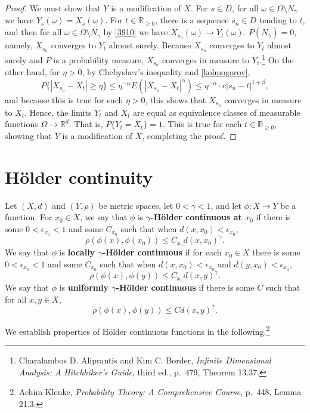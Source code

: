 \documentclass{article}
\theoremstyle{definition}
\theoremstyle{definition}
\begin{document}
\begin{proof}
We must show that $Y$ is a modification of $X$. For $s \in D$, for all $\omega \in \Omega \setminus N_\gamma$ we have
$Y_s(\omega) = X_s(\omega)$. For $t \in \mathbb{R}_{\geq 0}$, there is a sequence $s_n \in D$ tending to $t$, and then
for all $\omega \in \Omega \setminus N_\gamma$  by \eqref{3910} we have $X_{s_n}(\omega) \to Y_t(\omega)$. 
$P(N_\gamma)=0$, namely, $X_{s_n}$ converges to $Y_t$ almost surely. Because $X_{s_n}$ converges to $Y_t$
almost surely and $P$ is a probability measure, $X_{s_n}$ converges in measure to $Y_t$.\footnote{Charalambos D. Aliprantis
and Kim C. Border, {\em Infinite Dimensional Analysis: A Hitchhiker's Guide}, third ed., p.~479, Theorem 13.37.}
On the other hand, 
for
$\eta>0$, by  Chebyshev's inequality and \eqref{kolmogorov},
\[
P\{|X_{s_n}-X_t| \geq \eta\} \leq \eta^{-\alpha} E(|X_{s_n}-X_t|^\alpha) \leq \eta^{-\alpha} \cdot c |s_n-t|^{1+\beta},
\]
and because this is true for each $\eta>0$,
this shows that $X_{s_n}$ converges in measure to $X_t$. Hence, 
the limits $Y_t$ and $X_t$ are equal as  equivalence classes of
measurable functions $\Omega \to \mathbb{R}^d$.
That is, $P\{Y_t = X_t\}=1$.  This is true for each $t \in \mathbb{R}_{\geq 0}$, showing that $Y$ is a modification of $X$, completing the proof.
\end{proof}

\section{H\"older continuity}
Let $(X,d)$ and $(Y,\rho)$ be metric spaces, let $0<\gamma<1$, and let
$\phi:X \to Y$ be a function. For 
$x_0 \in X$, we say that $\phi$ is \textbf{$\gamma$-H\"older continuous at $x_0$}
if there is some $0<\epsilon_{x_0}<1$ and some $C_{x_0}$ such that when
$d(x,x_0)< \epsilon_{x_0}$,
\[
\rho(\phi(x),\phi(x_0)) \leq C_{x_0} d(x,x_0)^\gamma.
\]
We say that $\phi$ is \textbf{locally $\gamma$-H\"older continuous} if for each
$x_0 \in X$ there is some $0<\epsilon_{x_0}<1$ and some
$C_{x_0}$ such that when $d(x,x_0)< \epsilon_{x_0}$ and $d(y,x_0)< \epsilon_{x_0}$,
\[
\rho(\phi(x),\phi(y)) \leq C_{x_0} d(x,y)^\gamma.
\]
We say that $\phi$ is \textbf{uniformly $\gamma$-H\"older continuous} if there is some
$C$ such that for all $x,y \in X$,
\[
\rho(\phi(x),\phi(y)) \leq C d(x,y)^\gamma.
\]

We establish properties of H\"older continuous functions in the following.\footnote{Achim Klenke, {\em Probability Theory: A Comprehensive Course}, p.~448, Lemma 21.3.}
\end{document}
